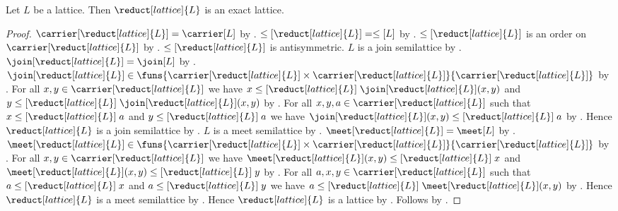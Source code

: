 \begin{theorem}\label{lattice_reduct_is_exact_lattice}
    Let $L$ be a lattice.
    Then $\reduct[lattice]{L}$ is an exact lattice.
\end{theorem}
\begin{proof}
    $\carrier[\reduct[lattice]{L}]=\carrier[L]$ by
        .
    $\leq[\reduct[lattice]{L}]=\leq[L]$ by
        .
    $\leq[\reduct[lattice]{L}]$ is an order on
        $\carrier[\reduct[lattice]{L}]$ by
        .
    $\leq[\reduct[lattice]{L}]$ is antisymmetric.
    $L$ is a join semilattice by .
    $\join[\reduct[lattice]{L}]=\join[L]$ by
        .
    $\join[\reduct[lattice]{L}]\in
        \funs{\carrier[\reduct[lattice]{L}]\times
            \carrier[\reduct[lattice]{L}]}{
            \carrier[\reduct[lattice]{L}]}$ by .
    For all $x,y\in\carrier[\reduct[lattice]{L}]$ we have
        $x\mathrel{\leq[\reduct[lattice]{L}]}
            \join[\reduct[lattice]{L}](x,y)$ and
        $y\mathrel{\leq[\reduct[lattice]{L}]}
            \join[\reduct[lattice]{L}](x,y)$ by .
    For all $x,y,a\in\carrier[\reduct[lattice]{L}]$ such that
        $x\mathrel{\leq[\reduct[lattice]{L}]}a$ and
        $y\mathrel{\leq[\reduct[lattice]{L}]}a$ we have
        $\join[\reduct[lattice]{L}](x,y)
            \mathrel{\leq[\reduct[lattice]{L}]}a$ by .
    Hence $\reduct[lattice]{L}$ is a join semilattice by
        .
    $L$ is a meet semilattice by .
    $\meet[\reduct[lattice]{L}]=\meet[L]$ by
        .
    $\meet[\reduct[lattice]{L}]\in
        \funs{\carrier[\reduct[lattice]{L}]\times
            \carrier[\reduct[lattice]{L}]}{
            \carrier[\reduct[lattice]{L}]}$ by .
    For all $x,y\in\carrier[\reduct[lattice]{L}]$ we have
        $\meet[\reduct[lattice]{L}](x,y)
            \mathrel{\leq[\reduct[lattice]{L}]}x$ and
        $\meet[\reduct[lattice]{L}](x,y)
            \mathrel{\leq[\reduct[lattice]{L}]}y$ by .
    For all $a,x,y\in\carrier[\reduct[lattice]{L}]$ such that
        $a\mathrel{\leq[\reduct[lattice]{L}]}x$ and
        $a\mathrel{\leq[\reduct[lattice]{L}]}y$ we have
        $a\mathrel{\leq[\reduct[lattice]{L}]}
            \meet[\reduct[lattice]{L}](x,y)$ by .
    Hence $\reduct[lattice]{L}$ is a meet semilattice by
        .
    Hence $\reduct[lattice]{L}$ is a lattice by
        .
    Follows by .
\end{proof}

